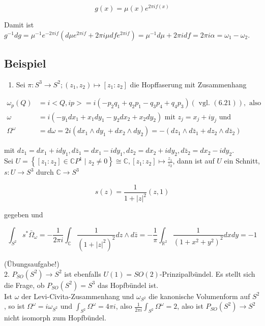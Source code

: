 \documentclass[10pt, letterpaper]{article}
\begin{document}
$$
g(x)=\mu(x) e^{2 \pi i f(x)}
$$

Damit ist\\
$g^{-1} d g=\mu^{-1} e^{-2 \pi i f}\left(d \mu e^{2 \pi i f}+2 \pi i \mu d f e^{2 \pi i f}\right)=\mu^{-1} d \mu+2 \pi i d f=2 \pi i \alpha=\omega_{1}-\omega_{2}$.

\subsection*{Beispiel}
\begin{enumerate}
  \item Sei $\pi: S^{3} \rightarrow S^{2} ;\left(z_{1}, z_{2}\right) \mapsto\left[z_{1}: z_{2}\right]$ die Hopffaserung mit Zusammenhang
\end{enumerate}

$$
\begin{aligned}
\omega_{p}(Q) & =i<Q, i p>=i\left(-p_{2} q_{1}+q_{2} p_{1}-q_{3} p_{4}+q_{4} p_{3}\right)(\text { vgl. }(6.21)), \text { also } \\
\omega & =i\left(-y_{1} d x_{1}+x_{1} d y_{1}-y_{2} d x_{2}+x_{2} d y_{2}\right) \text { mit } z_{j}=x_{j}+i y_{j} \text { und } \\
\Omega^{\omega} & =d \omega=2 i\left(d x_{1} \wedge d y_{1}+d x_{2} \wedge d y_{2}\right)=-\left(d z_{1} \wedge d \bar{z}_{1}+d z_{2} \wedge d \bar{z}_{2}\right)
\end{aligned}
$$

mit $d z_{1}=d x_{1}+i d y_{1}, d \bar{z}_{1}=d x_{1}-i d y_{1}, d z_{2}=d x_{2}+i d y_{2}, d \bar{z}_{2}=d x_{2}-i d y_{2}$.\\
Sei $U=\left\{\left[z_{1}: z_{2}\right] \in \mathbb{C} P^{1} \mid z_{2} \neq 0\right\} \cong \mathbb{C},\left[z_{1}: z_{2}\right] \mapsto \frac{z_{1}}{z_{2}}$, dann ist auf $U$ ein Schnitt, $s: U \rightarrow S^{3}$ durch $\mathbb{C} \rightarrow S^{3}$

$$
s(z)=\frac{1}{1+|z|^{2}}(z, 1)
$$

gegeben und

$$
\int_{S^{2}} s^{*} \bar{\Omega}_{\omega}=-\frac{1}{2 \pi i} \int_{\mathbb{C}} \frac{1}{\left(1+|z|^{2}\right)^{2}} d z \wedge d \bar{z}=-\frac{1}{\pi} \int_{\mathbb{R}^{2}} \frac{1}{\left(1+x^{2}+y^{2}\right)^{2}} d x d y=-1
$$

(Übungsaufgabe!)\\
2. $P_{S O}\left(S^{2}\right) \rightarrow S^{2}$ ist ebenfalls $U(1)=S O(2)$-Prinzipalbündel. Es stellt sich die Frage, ob $P_{S O}\left(S^{2}\right)=S^{3}$ das Hopfbündel ist.\\
Ist $\omega$ der Levi-Civita-Zusammenhang und $\omega_{S^{2}}$ die kanonische Volumenform auf $S^{2}$, so ist $\Omega^{\omega}=i \omega_{S^{2}}$ und $\int_{S^{2}} \Omega^{\omega}=4 \pi i$, also $\frac{1}{2 \pi i} \int_{S^{2}} \Omega^{\omega}=2$, also ist $P_{S O}\left(S^{2}\right) \rightarrow S^{2}$ nicht isomorph zum Hopfbündel.
\end{document}
